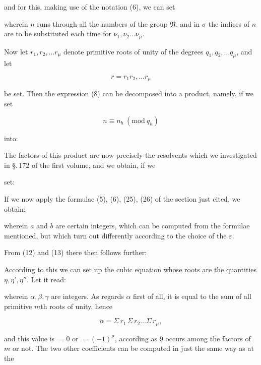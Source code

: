and for this, making use of the notation (6), we can set


wherein $n$ runs through all the numbers of the group $\mathfrak{N}$, and in $\sigma$ the
indices of $n$ are to be substituted each time for $\nu_1, \nu_2 \ldots \nu_\mu$.

Now let $r_1, r_2, \ldots r_\mu$ denote primitive roots of unity of the degrees
$q_1, q_2, \ldots q_\mu$, and let

\[ r = r_1 r_2, \ldots r_\mu \]

be set. Then the expression (8) can be decomposed into a product,
namely, if we set

\[ n \equiv n_h \ (\mathrm{mod}\ q_h) \]

into:


The factors of this product are now precisely the resolvents which we
investigated in \S.\,172 of the first volume, and we obtain, if we


set:


If we now apply the formulae (5), (6), (25), (26) of the section just
cited, we obtain:



wherein $a$ and $b$ are certain integers, which can be computed from the
formulae mentioned, but which turn out differently according to the choice
of the $\varepsilon$.

From (12) and (13) there then follows further:


According to this we can set up the cubic equation whose roots are the
quantities $\eta, \eta', \eta''$. Let it read:


wherein $\alpha, \beta, \gamma$ are integers. As regards $\alpha$ first of
all, it is equal to the sum of all primitive $m$th
roots of unity, hence

\[ \alpha = \Sigma\, r_1\, \Sigma\, r_2 \ldots \Sigma\, r_\mu, \]

and this value is $= 0$ or $= (-1)^{\mu}$,
according as 9 occurs among the factors of $m$ or not. The two
other coefficients can be computed in just the same way as at the
